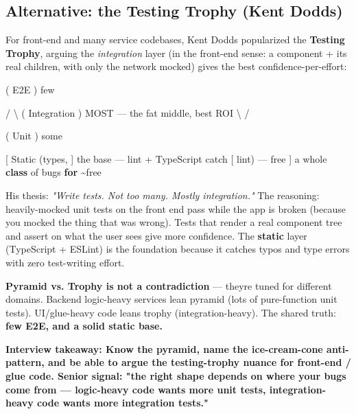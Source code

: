 \documentclass[11pt]{article}
\newenvironment{Shaded}{\begin{snugshade}}{\end{snugshade}}
\newcommand{\ControlFlowTok}[1]{\textcolor[rgb]{0.99,0.74,0.29}{\textbf{#1}}}
\newcommand{\KeywordTok}[1]{\textcolor[rgb]{0.81,0.81,0.76}{\textbf{#1}}}
\newcommand{\NormalTok}[1]{\textcolor[rgb]{0.81,0.81,0.76}{#1}}
\newcommand{\OperatorTok}[1]{\textcolor[rgb]{0.81,0.81,0.76}{#1}}
\begin{document}
\subsection{Alternative: the Testing Trophy (Kent Dodds)}\label{alternative-the-testing-trophy-kent-dodds}

For front-end and many service codebases, Kent Dodds popularized the \textbf{Testing Trophy}, arguing the \emph{integration} layer (in the front-end sense: a component + its real children, with only the network mocked) gives the best confidence-per-effort:


\begin{Shaded}
\begin{Highlighting}[]

\NormalTok{           (   E2E     )      few}

        \OperatorTok{/}                 \OperatorTok{\textbackslash{}}
\NormalTok{       (   Integration     )  MOST — the fat middle, best ROI}
\NormalTok{        \textbackslash{}                 }\OperatorTok{/}

\NormalTok{        (      Unit        )  some}

\NormalTok{        [  Static (types,  ]  the base — lint }\OperatorTok{+}\NormalTok{ TypeScript catch}
\NormalTok{        [  lint) — free    ]  a whole }\KeywordTok{class}\NormalTok{ of bugs }\ControlFlowTok{for} \OperatorTok{\textasciitilde{}}\NormalTok{free}
\end{Highlighting}
\end{Shaded}

His thesis: \emph{"Write tests. Not too many. Mostly integration."} The reasoning: heavily-mocked unit tests on the front end pass while the app is broken (because you mocked the thing that was wrong). Tests that render a real component tree and assert on what the user sees give more confidence. The \textbf{static} layer (TypeScript + ESLint) is the foundation because it catches typos and type errors with zero test-writing effort.

\textbf{Pyramid vs. Trophy is not a contradiction} --- they\textquotesingle re tuned for different domains. Backend logic-heavy services lean pyramid (lots of pure-function unit tests). UI/glue-heavy code leans trophy (integration-heavy). The shared truth: \textbf{few E2E, and a solid static base.}

\textbf{Interview takeaway: Know the pyramid, name the ice-cream-cone anti-pattern, and be able to argue the testing-trophy nuance for front-end / glue code. Senior signal: "the right shape depends on where your bugs come from --- logic-heavy code wants more unit tests, integration-heavy code wants more integration tests."}
\end{document}
